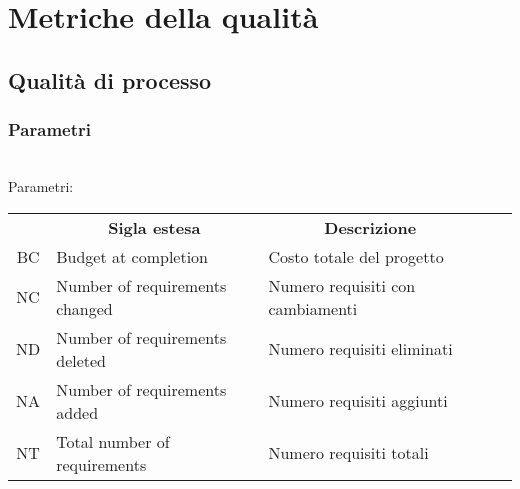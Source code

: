 \section{Metriche della qualità}
\subsection{Qualità di processo}
\subsubsection{Parametri}\mbox{}\\
Parametri:
\begin{table}[H]
    \centering
    \renewcommand{\arraystretch}{1.8}
    \begin{tabular}{| c | p{4.2cm} | p{5cm} |c |  c  }
        \rowcolor[HTML]{a52a2a}
        \multicolumn{1}{c}{\color[HTML]{FFFFFF} \textbf{Codice}}       &
        \multicolumn{1}{c}{\color[HTML]{FFFFFF} \textbf{Sigla estesa}} &
        \multicolumn{1}{c}{\color[HTML]{FFFFFF} \textbf{Descrizione}}                                                                      \\
        BC                                                             & Budget at completion           & Costo totale del progetto        \\
        NC                                                             & Number of requirements changed & Numero requisiti con cambiamenti \\
        ND                                                             & Number of requirements deleted & Numero requisiti eliminati       \\
        NA                                                             & Number of requirements added   & Numero requisiti aggiunti        \\
        NT                                                             & Total number of requirements   & Numero requisiti totali          \\
        \hline
    \end{tabular}
\end{table}

